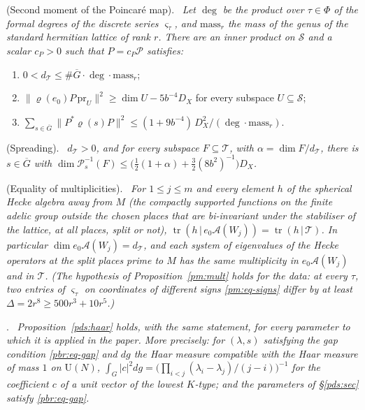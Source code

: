 \documentclass[10pt]{amsart}
\theoremstyle{definition}
\theoremstyle{remark}
\providecommand{\auDX}{D_X}
\providecommand{\auG}{\overline G}
\providecommand{\auP}{\mathcal P}
\providecommand{\auPl}{\Phi}
\providecommand{\auS}{\mathcal S}
\providecommand{\auT}{\mathcal T}
\providecommand{\auU}{\mathrm U}
\providecommand{\audT}{d_{\auT}}
\newenvironment{quotedthm}[2]{\par\medskip\noindent\begingroup
  \textbf{#1}#2.\ \itshape\ignorespaces}{\endgroup\par\medskip}
\begin{document}
\begin{quotedthm}{\cite[Proposition~14.32]{P46}}{ (Second moment of the Poincar\'e map)}
Let $\deg$ be the product over $\tau\in\auPl$ of the formal degrees of the discrete series
$\varsigma_\tau$, and $\mathrm{mass}_r$ the mass of the genus of the standard hermitian lattice of
rank $r$. There are an inner product on $\auS$ and a scalar $c_P>0$ such that $P=c_P\auP$
satisfies:
\begin{enumerate}
\item[(i)] $0<\audT\le\#\auG\cdot\deg\cdot\mathrm{mass}_r$;
\item[(ii)] $\|\varrho(e_0)P\,\mathrm{pr}_U\|^2\ge\dim U-5b^{-4}\auDX$ for every subspace
$U\subseteq\auS$;
\item[(iii)] $\sum_{s\in\auG}\|P^*\varrho(s)P\|^2\le(1+9b^{-4})\,\auDX^2/(\deg\cdot
\mathrm{mass}_r)$.
\end{enumerate}
\end{quotedthm}

\begin{quotedthm}{\cite[Proposition~14.34]{P46}}{ (Spreading)}
$\audT>0$, and for every subspace $F\subseteq\auT$, with $\alpha=\dim F/\audT$, there is
$s\in\auG$ with $\dim\auP_s^{-1}(F)\le\bigl(\tfrac12(1+\alpha)+\tfrac32(8b^2)^{-1}\bigr)\auDX$.
\end{quotedthm}

\begin{quotedthm}{\cite[Proposition~14.36]{P46}}{ (Equality of multiplicities)}
For $1\le j\le m$ and every element $h$ of the spherical Hecke algebra away from $M$ (the
compactly supported functions on the finite adelic group outside the chosen places that are
bi-invariant under the stabiliser of the lattice, at all places, split or not),
$\operatorname{tr}(h\,|\,e_0\mathcal A(W_j))=\operatorname{tr}(h\,|\,\auT)$. In particular
$\dim e_0\mathcal A(W_j)=\audT$, and each system of eigenvalues of the Hecke operators at the split
places prime to $M$ has the same multiplicity in $e_0\mathcal A(W_j)$ and in $\auT$. (The
hypothesis of Proposition~\ref{pm:mult} holds for the data: at every $\tau$, two entries of
$\varsigma_\tau$ on coordinates of different signs \eqref{pm:eq-signs} differ by at least
$\Delta=2r^8\ge500r^3+10r^5$.)
\end{quotedthm}

\begin{quotedthm}{\cite[Proposition~2.19]{P49}}{}
Proposition~\ref{pds:haar} holds, with the same statement, for every parameter to which it is
applied in the paper. More precisely: for $(\lambda,s)$ satisfying the gap condition
\eqref{pbr:eq-gap} and $dg$ the Haar measure compatible with the Haar measure of mass $1$ on
$\auU(N)$, $\int_G|c|^2dg=\bigl(\prod_{i<j}(\lambda_i-\lambda_j)/(j-i)\bigr)^{-1}$ for the coefficient
$c$ of a unit vector of the lowest $K$-type; and the parameters of \S\ref{pds:sec} satisfy
\eqref{pbr:eq-gap}.
\end{quotedthm}
\end{document}
